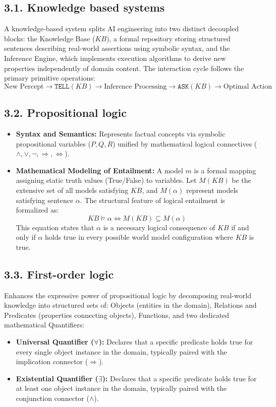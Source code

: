 \documentclass[11pt,a4paper]{article}
\begin{document}
\subsection{3.1. Knowledge based systems}
A knowledge-based system splits AI engineering into two distinct decoupled blocks: the Knowledge Base ($KB$), a formal repository storing structured sentences describing real-world assertions using symbolic syntax, and the Inference Engine, which implements execution algorithms to derive new properties independently of domain content. The interaction cycle follows the primary primitive operations:
\begin{equation}
    \text{New Percept} \xrightarrow{} \texttt{TELL}(KB) \xrightarrow{} \text{Inference Processing} \xrightarrow{} \texttt{ASK}(KB) \rightarrow \text{Optimal Action}
\end{equation}

\subsection{3.2. Propositional logic}
\begin{itemize}
    \item \textbf{Syntax and Semantics:} Represents factual concepts via symbolic propositional variables ($P, Q, R$) unified by mathematical logical connectives ($\wedge, \vee, \neg, \Rightarrow, \Leftrightarrow$).
    \item \textbf{Mathematical Modeling of Entailment:} A model $m$ is a formal mapping assigning static truth values (True/False) to variables. Let $M(KB)$ be the extensive set of all models satisfying $KB$, and $M(\alpha)$ represent models satisfying sentence $\alpha$. The structural feature of logical entailment is formalized as:
    \begin{equation}
        KB \models \alpha \iff M(KB) \subseteq M(\alpha)
    \end{equation}
    This equation states that $\alpha$ is a necessary logical consequence of $KB$ if and only if $\alpha$ holds true in every possible world model configuration where $KB$ is true.
\end{itemize}

\subsection{3.3. First-order logic}
Enhances the expressive power of propositional logic by decomposing real-world knowledge into structured sets of: Objects (entities in the domain), Relations and Predicates (properties connecting objects), Functions, and two dedicated mathematical Quantifiers:
\begin{itemize}
    \item \textbf{Universal Quantifier ($\forall$):} Declares that a specific predicate holds true for every single object instance in the domain, typically paired with the implication connector ($\Rightarrow$).
    \item \textbf{Existential Quantifier ($\exists$):} Declares that a specific predicate holds true for at least one object instance in the domain, typically paired with the conjunction connector ($\wedge$).
\end{itemize}
\end{document}
